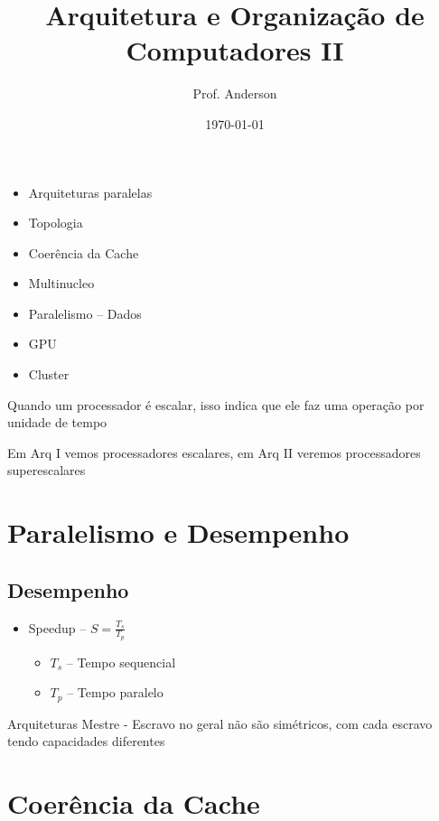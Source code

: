 \documentclass[12pt]{article}
\title{Arquitetura e Organização de Computadores II}
\author{Prof. Anderson}
\date{\today}
\begin{document}
\maketitle

\begin{itemize}
    \item Arquiteturas paralelas
    \item Topologia
    \item Coerência da Cache
    \item Multinucleo
    \item Paralelismo -- Dados
    \item GPU
    \item Cluster
\end{itemize}

Quando um processador é escalar, isso indica que ele faz uma operação por 
unidade de tempo

Em Arq I vemos processadores escalares, em Arq II veremos processadores 
superescalares

\section{Paralelismo e Desempenho}


\subsection{Desempenho}
\begin{itemize}
    \item Speedup -- \( S = \frac{T_s}{T_p}\)
    \begin{itemize}
        \item $T_s$ -- Tempo sequencial
        \item $T_p$ -- Tempo paralelo
    \end{itemize}
\end{itemize}

Arquiteturas Mestre - Escravo no geral não são simétricos, com cada escravo 
tendo capacidades diferentes

\section{Coerência da Cache}
\end{document}
